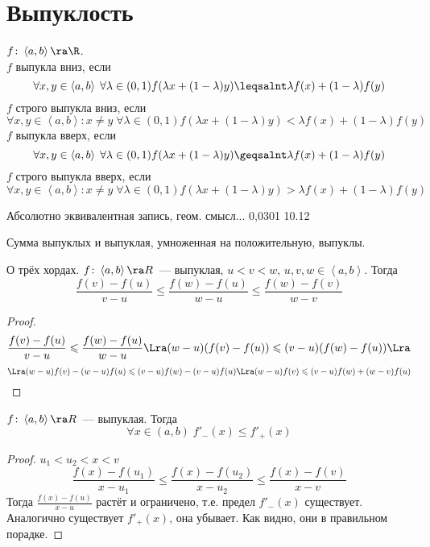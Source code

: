 \section{Выпуклость}

\begin{Def}
$f\colon \left<a, b\right> \ra \R$. \\
$f$ выпукла вниз, если 
$$\forall x, y \in \left<a, b\right>\; \forall \lambda \in (0, 1) f(\lambda x + (1-\lambda)y) \leqsalnt \lambda f(x) + (1-\lambda) f(y)$$
$f$ строго выпукла вниз, если 
$$\forall x, y \in \left<a, b\right>\colon x \ne y\; \forall \lambda \in (0, 1) f(\lambda x + (1-\lambda)y) < \lambda f(x) + (1-\lambda) f(y)$$
$f$ выпукла вверх, если 
$$\forall x, y \in \left<a, b\right>\; \forall \lambda \in (0, 1) f(\lambda x + (1-\lambda)y) \geqsalnt \lambda f(x) + (1-\lambda) f(y)$$
$f$ строго выпукла вверх, если 
$$\forall x, y \in \left<a, b\right>\colon x \ne y\; \forall \lambda \in (0, 1) f(\lambda x + (1-\lambda)y) > \lambda f(x) + (1-\lambda) f(y)$$
\end{Def}
Абсолютно эквивалентная запись, геом. смысл...	0,0301
10.12	

\begin{Rem}
Сумма выпуклых и выпуклая, умноженная на положительную, выпуклы.
\end{Rem}

\begin{lemma}
О трёх хордах. $f\colon \left<a, b\right> \ra R$~--- выпуклая, $u < v < w$, $u,v,w \in \left<a, b\right>$. Тогда
$$\frac{f(v) - f(u)}{v - u} \leqslant \frac{f(w) - f(u)}{w-u} \leqslant \frac{f(w) - f(v)}{w-v}$$
\end{lemma}
\begin{proof}
$$\frac{f(v) - f(u)}{v - u} \leqslant \frac{f(w) - f(u)}{w-u} \Lra (w-u)(f(v) - f(u)) \leqslant (v-u)(f(w) - f(u)) \Lra$$
$$\Lra (w-u)f(v) - (w-u)f(u) \leqslant (v-u)f(w) - (v-u)f(u) \Lra (w-u)f(v) \leqslant (v-u)f(w) + (w-v)f(u)$$
\end{proof}

\begin{theorem}{}
$f\colon \left<a, b\right> \ra R$~--- выпуклая. Тогда 
$$\forall x \in (a, b)\; f'_-(x) \leqslant f'_+(x)$$
\end{theorem}
\begin{proof}
$u_1 < u_2 < x < v$
$$\frac{f(x)-f(u_1)}{x-u_1} \leqslant \frac{f(x)-f(u_2)}{x-u_2} \leqslant \frac{f(x)-f(v)}{x-v}$$
Тогда $\frac{f(x)-f(u)}{x-u}$ растёт и ограничено, т.е. предел $f'_-(x)$ существует.
Аналогично существует $f'_+(x)$, она убывает. Как видно, они в правильном порадке.
\end{proof}

